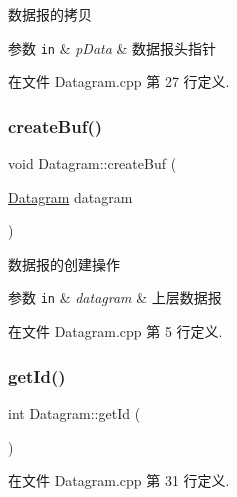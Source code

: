 数据报的拷贝 


\begin{DoxyParams}[1]{参数}
\mbox{\tt in}  & {\em p\+Data} & 数据报头指针 \\
\hline
\end{DoxyParams}


在文件 Datagram.\+cpp 第 27 行定义.

\mbox{\label{class_datagram_ad54ae1c5f2522a9d6ab2145bfa33e7e4}} 
\subsubsection{\texorpdfstring{create\+Buf()}{createBuf()}}
{\footnotesize\ttfamily void Datagram\+::create\+Buf (\begin{DoxyParamCaption}\item[{\hyperlink{class_datagram}{Datagram}}]{datagram }\end{DoxyParamCaption})}



数据报的创建操作 


\begin{DoxyParams}[1]{参数}
\mbox{\tt in}  & {\em datagram} & 上层数据报 \\
\hline
\end{DoxyParams}


在文件 Datagram.\+cpp 第 5 行定义.

\mbox{\label{class_datagram_aac2187f8896acdd5dc5424b8934d454a}} 
\subsubsection{\texorpdfstring{get\+Id()}{getId()}}
{\footnotesize\ttfamily int Datagram\+::get\+Id (\begin{DoxyParamCaption}{ }\end{DoxyParamCaption})}



在文件 Datagram.\+cpp 第 31 行定义.

\mbox{\label{class_datagram_ab3912f9748416eac75309fae598017c8}} 
